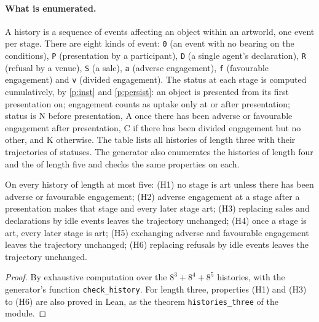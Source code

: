 \documentclass{situationist-preprint}
\begin{document}
\paragraph{What is enumerated.} A history is a sequence of events affecting an object within an artworld, one event per stage. There are eight kinds of event: \texttt{0} (an event with no bearing on the conditions), \texttt{P} (presentation by a participant), \texttt{D} (a single agent's declaration), \texttt{R} (refusal by a venue), \texttt{S} (a sale), \texttt{a} (adverse engagement), \texttt{f} (favourable engagement) and \texttt{v} (divided engagement). The status at each stage is computed cumulatively, by \ref{p:inst} and \ref{p:persist}: an object is presented from its first presentation on; engagement counts as uptake only at or after presentation; status is N before presentation, A once there has been adverse or favourable engagement after presentation, C if there has been divided engagement but no other, and K otherwise. The table lists all \stnhistthree{} histories of length three with their trajectories of statuses. The generator also enumerates the \stnhistfour{} histories of length four and the \stnhistfive{} of length five and checks the same properties on each.

\begin{proposition}\label{p:histories}
On every history of length at most five: (H1) no stage is art unless there has been adverse or favourable engagement; (H2) adverse engagement at a stage after a presentation makes that stage and every later stage art; (H3) replacing sales and declarations by idle events leaves the trajectory unchanged; (H4) once a stage is art, every later stage is art; (H5) exchanging adverse and favourable engagement leaves the trajectory unchanged; (H6) replacing refusals by idle events leaves the trajectory unchanged.
\end{proposition}

\begin{proof}
By exhaustive computation over the $8^3 + 8^4 + 8^5$ histories, with the generator's function \texttt{check\_history}. For length three, properties (H1) and (H3) to (H6) are also proved in Lean, as the theorem \texttt{histories\_three} of the module.
\end{proof}
\end{document}
